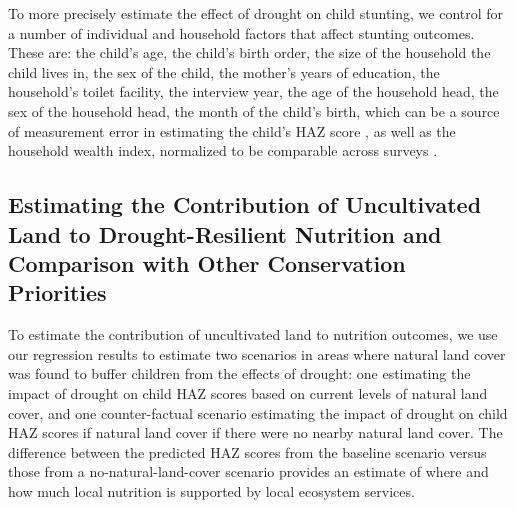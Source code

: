 \documentclass{article}
\begin{document}
To more precisely estimate the effect of drought on child stunting, we control for a number of individual and household factors that affect stunting outcomes.  These are: the child's age, the child's birth order, the size of the household the child lives in, the sex of the child, the mother's years of education, the household's toilet facility, the interview year, the age of the household head, the sex of the household head, the month of the child's birth, which can be a source of measurement error in estimating the child's HAZ score \cite{larsen2019misreporting}, as well as the household wealth index, normalized to be comparable across surveys \cite{Rutstein2014c}.

\subsection{Estimating the Contribution of Uncultivated Land to Drought-Resilient Nutrition and Comparison with Other Conservation Priorities}
To estimate the contribution of uncultivated land to nutrition outcomes, we use our regression results to estimate two scenarios in areas where natural land cover was found to buffer children from the effects of drought: one estimating the impact of drought on child HAZ scores based on current levels of natural land cover, and one counter-factual scenario estimating the impact of drought on child HAZ scores if natural land cover if there were no nearby natural land cover.  The difference between the predicted HAZ scores from the baseline scenario versus those from a no-natural-land-cover scenario provides an estimate of where and how much local nutrition is supported by local ecosystem services.
\end{document}
